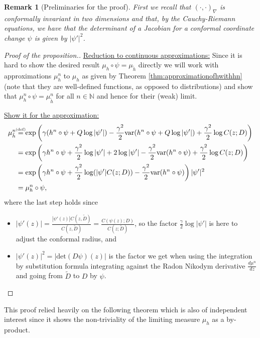 \documentclass[11pt,reqno]{amsart}
\numberwithin{equation}{section}
\newtheorem{rem}[thm]{Remark}
\newcommand{\eqbydef}{\mathrel{\stackrel{\hspace*{-3mm}\text{\tiny(def)}\hspace*{-3mm}}{=}}}
\begin{document}
\begin{rem}[Preliminaries for the proof]
	First we recall that $(\cdot,\cdot)_\nabla$ is conformally invariant in two dimensions and that, by the Cauchy-Riemann equations, we have that the determinant of a Jacobian for a conformal coordinate change $\psi$ is given by $|\psi'|^2$.
\end{rem}
\begin{proof}[Proof of the proposition.]
	\underline{Reduction to continuous approximations:} Since it is hard to show the desired result $\mu_h\circ\psi = \mu_{\tilde h}$ directly we will work with approximations $\mu_h^n$ to $\mu_h$ as given by Theorem \ref{thm:approximationofhwithhn} (note that they are well-defined functions, as opposed to distributions) and show that $\mu_h^n\circ\psi=\mu_{\tilde h}^n$ for all $n\in\mathbb N$ and hence for their (weak) limit.
	
	\underline{Show it for the approximation:}
	\begin{align*}
		\mu_{\tilde h}^n&\eqbydef
		\exp\left(\gamma(h^n\circ\psi+Q\log|\psi'|)-\frac{\gamma^2}{2}\text{var}(h^n\circ\psi+Q\log|\psi'|)+\frac{\gamma^2}{2}\log C(z;D) \right)\\
		&=\exp\left(\gamma h^n\circ\psi+\frac{\gamma^2}{2}\log|\psi'|+2\log|\psi'|-\frac{\gamma^2}{2}\text{var}(h^n\circ\psi)+\frac{\gamma^2}{2}\log C(z;D) \right)\\
		&=\exp\left(\gamma h^n\circ\psi+\frac{\gamma^2}{2}\log(|\psi'|C(z;D))-\frac{\gamma^2}{2}\text{var}(h^n\circ\psi)\right)|\psi'|^2\\
		&=\mu_h^n\circ\psi,
	\end{align*}
	where the last step holds since \begin{itemize}
		\item $|\psi'(z)|=\frac{|\psi'(z)|C(z,\tilde D)}{C(z,\tilde D)}=\frac{C(\psi(z);D)}{C(z;\tilde D)}$, so the factor $\frac{\gamma}{2}\log|\psi'|$ is here to adjust the conformal radius, and
		\item $|\psi'(z)|^2 = |\text{det}(D\psi)(z)|$ is the factor we get when using the integration by substitution formula integrating against the Radon Nikodym derivative $\frac{d\mu^n}{dz}$ and going from $\tilde D$ to $D$ by $\psi$.
	\end{itemize}
\end{proof}

This proof relied heavily on the following theorem which is also of independent interest since it shows the non-triviality of the limiting measure $\mu_h$ as a by-product.
\end{document}
